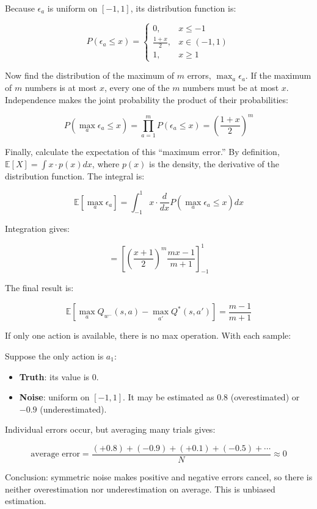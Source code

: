 Because \(\epsilon_a\) is uniform on \([-1,1]\), its distribution function is:

\[
P(\epsilon_a\le x)=
\begin{cases}
0, & x\le -1\\
\frac{1+x}{2}, & x\in(-1,1)\\
1, & x\ge 1
\end{cases}
\]

Now find the distribution of the maximum of \(m\) errors, \(\max_a\epsilon_a\). If the maximum of \(m\) numbers is at most \(x\), every one of the \(m\) numbers must be at most \(x\). Independence makes the joint probability the product of their probabilities:

\[
P(\max_a\epsilon_a\le x)
=\prod_{a=1}^{m}P(\epsilon_a\le x)
=(\frac{1+x}{2})^{m}
\]

Finally, calculate the expectation of this ``maximum error.'' By definition, \(\mathbb{E}[X]=\int x\cdot p(x)dx\), where \(p(x)\) is the density, the derivative of the distribution function. The integral is:

\[
\mathbb{E}[\max_a\epsilon_a]
=\int_{-1}^{1}x\cdot\frac{d}{dx}P(\max_a\epsilon_a\le x)dx
\]

Integration gives:

\[
=[(\frac{x+1}{2})^{m}\frac{mx-1}{m+1}]_{-1}^{1}
\]

The final result is:

\[
\mathbb{E}[\max_a Q_{w^{-}}(s,a)-\max_{a'}Q^{*}(s,a')]=\frac{m-1}{m+1}
\]

If only one action is available, there is no max operation. With each sample:

Suppose the only action is \(a_1\):

\begin{itemize}
\tightlist
\item
  \textbf{Truth}: its value is \(0\).
\item
  \textbf{Noise}: uniform on \([-1,1]\). It may be estimated as \(0.8\) (overestimated) or \(-0.9\) (underestimated).
\end{itemize}

Individual errors occur, but averaging many trials gives:

\[
\text{average error}=\frac{(+0.8)+(-0.9)+(+0.1)+(-0.5)+\cdots}{N}\approx 0
\]

Conclusion: symmetric noise makes positive and negative errors cancel, so there is neither overestimation nor underestimation on average. This is unbiased estimation.

